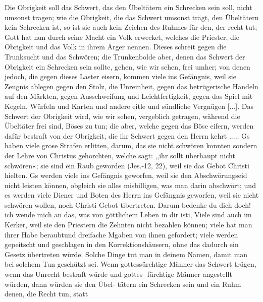{
    Die Obrigkeit soll 
    das Schwert, das den Übeltätern ein
    Schrecken sein soll, nicht umsonst tragen; wie die Obrigkeit, die
    das Schwert umsonst trägt, den Übeltätern kein Schrecken ist, so
    ist sie auch kein Zeichen des Ruhmes für den, der recht tut;
    Gott hat nun durch seine Macht ein Volk erwecket, welches
    die Priester, die Obrigkeit und das Volk in ihrem Ärger 
     nennen. Dieses schreit gegen die Trunksucht 
     und das Schwören;
    die Trunkenbolde aber, denen das Schwert der Obrigkeit ein
    Schrecken sein sollte, gehen, wie wir sehen, frei umher; von denen
    jedoch, die gegen dieses Laster eisern, kommen viele ins Gefängnis,
    weil sie Zeugnis ablegen gegen den Stolz, die Unreinheit, gegen
    das betrügerische Handeln auf den Märkten, gegen Ausschweifung
    und Leichtfertigkeit, gegen das Spiel mit 
    Kegeln, Würfeln und
    Karten und andere eitle und sündliche Vergnügen [...].
    Das Schwert der Obrigkeit wird, wie wir sehen, vergeblich 
    getragen, während die Übeltäter frei sind, Böses zu tun; die aber,
    welche gegen das Böse eifern, werden dafür bestraft von der
    Obrigkeit, die ihr Schwert gegen den Herrn kehrt ..... Gs haben
    viele grose Strafen erlitten, darum, das sie nicht schwören konnten
    sondern der Lehre von Christus gehorchten, welche sagt: ,,ihr sollt
    überhaupt nicht schwören«; sie sind ein Raub geworden (Jes.-12, 22),
    weil sie das Gebot Christi hielten. Gs werden viele ins Gefängnis
    geworfen, weil sie den Abschwörungseid nicht leisten können, obgleich
    sie alles misbilligen, was man darin abschwört; und es werden
    viele Diener und Boten des Herrn ins Gefängnis geworfen, weil sie
    nicht schwören wollen, noch Christi Gebot tibertreten. Darum bedenke
    du dich doch! ich wende mich an das, was von göttlichem Leben
    in dir isti, Viele sind auch im Kerker, weil sie den Priestern die
    Zehnten nicht bezahlen können; viele hat man ihrer Habe beraubtund
    dreifache Mgaben von ihnen gefordert; viele werden gepeitscht und
    geschlagen in den Korrektionshäusern, ohne das dadurch ein Gesetz
    übertreten würde. Solche Dinge tut man in deinem Namen, damit
    man bei solchem Tun geschützt sei. Wenn gottessürchtige Männer
    das Schwert trügen, wenn das Unrecht bestraft würde und gottes-
    fürchtige Männer angestellt würden, dann würden sie den Übel-
    tätern ein Schrecken sein und ein Ruhm denen, die Recht tun, statt
}
